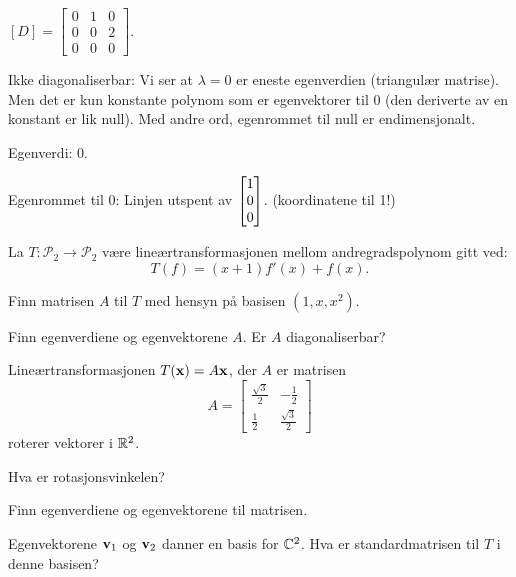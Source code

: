 \begin{losning}

\begin{punkt}
$[D]=\begin{bmatrix}
0 & 1 & 0\\
0 & 0 & 2\\
0 & 0 & 0
\end{bmatrix}$.
\end{punkt}

\begin{punkt}
Ikke diagonaliserbar: Vi ser at $\lambda=0$ er eneste egenverdien (triangulær matrise). Men det er kun konstante polynom som er egenvektorer til 0 (den deriverte av en konstant er lik null). Med andre ord, egenrommet til null er endimensjonalt.
\end{punkt}

\begin{punkt}
Egenverdi: 0.

\noindent
Egenrommet til 0: Linjen utspent av $\begin{bmatrix} 1 \\ 0 \\ 0 \end{bmatrix}$. (koordinatene til 1!)
\end{punkt}
\end{losning}



\begin{oppgave}
La $T:\mathcal{P}_2\rightarrow \mathcal{P}_2$ være lineærtransformasjonen mellom andregradspolynom gitt ved: $$T(f)=(x+1)f'(x)+f(x).$$

\begin{punkt}
Finn matrisen $A$ til $T$ med hensyn på basisen $(1,x,x^2)$.
\end{punkt}


\begin{punkt}
Finn egenverdiene og egenvektorene $A$. Er $A$ diagonaliserbar?
\end{punkt}
\end{oppgave}

\begin{oppgave}
Lineærtransformasjonen $T(\mathbf{x})=A\mathbf{x}$, der $A$ er matrisen
\[
A=
\begin{bmatrix}
\frac{\sqrt{3}}{2} & -\frac{1}{2} \\ \frac{1}{2} & \frac{\sqrt{3}}{2}
\end{bmatrix}
\]
roterer vektorer i $\mathbb{R}^2$. 
\begin{punkt}
Hva er rotasjonsvinkelen?
\end{punkt}
\begin{punkt}
Finn egenverdiene og egenvektorene til matrisen. 
\end{punkt}
\begin{punkt}
Egenvektorene $\mathbf{v}_1$ og $\mathbf{v}_2$ danner en basis for $\mathbb{C}^2$. Hva er standardmatrisen til $T$ i denne basisen?
\end{punkt}

\end{oppgave}



